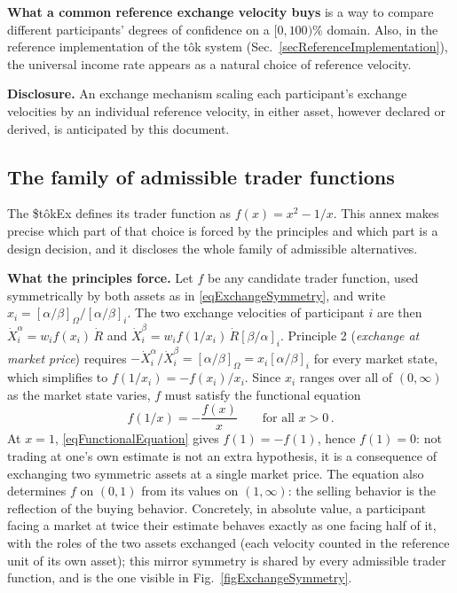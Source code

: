 \documentclass[letterpaper]{article}
\newcommand{\priceAB}{\left[\alpha / \beta\right]}
\newcommand{\priceBA}{\left[\beta / \alpha\right]}
\newcommand{\StokEx}{\$t\^{o}kEx}
\newcommand{\tok}{t\^{o}k}
\begin{document}
\textbf{What a common reference exchange velocity buys} is a way to compare different participants' degrees of confidence on a $[0,100)\%$ domain.
Also, in the reference implementation of the \tok{} system (Sec.~\ref{secReferenceImplementation}), the universal income
rate appears as a natural choice of reference velocity.

\textbf{Disclosure.} An exchange mechanism scaling each participant's exchange velocities
by an individual reference velocity, in either asset, however declared or derived, is
anticipated by this document.


\subsection{The family of admissible trader functions}\label{secTraderFamily}

The \StokEx{} defines its trader function as $f(x) = x^2 - 1/x$. This annex makes precise which part of that choice is forced by the principles and which part is a design decision, and it discloses the whole family of admissible alternatives.

\textbf{What the principles force.} Let $f$ be any candidate trader function, used symmetrically by both assets as in \eqref{eqExchangeSymmetry}, and write $x_i = \priceAB_\Omega / \priceAB_i$. The two exchange velocities of participant $i$ are then $\dot{X}^\alpha_i = w_i f(x_i)\, \dot{R}$ and $\dot{X}^\beta_i = w_i f(1/x_i)\, \dot{R} \priceBA_i$. Principle 2 (\emph{exchange at market price}) requires $-\dot{X}^\alpha_i / \dot{X}^\beta_i = \priceAB_\Omega = x_i \priceAB_i$ for every market state, which simplifies to $f(1/x_i) = -f(x_i)/x_i$. Since $x_i$ ranges over all of $(0,\infty)$ as the market state varies, $f$ must satisfy the functional equation
\begin{equation}
    f(1/x) = -\frac{f(x)}{x} \qquad \text{for all } x > 0\,. \label{eqFunctionalEquation}
\end{equation}
At $x = 1$, \eqref{eqFunctionalEquation} gives $f(1) = -f(1)$, hence $f(1) = 0$: not trading at one's own estimate is not an extra hypothesis, it is a consequence of exchanging two symmetric assets at a single market price. The equation also determines $f$ on $(0,1)$ from its values on $(1,\infty)$: the selling behavior is the reflection of the buying behavior. Concretely, in absolute value, a participant facing a market at twice their estimate behaves exactly as one facing half of it, with the roles of the two assets exchanged (each velocity counted in the reference unit of its own asset); this mirror symmetry is shared by every admissible trader function, and is the one visible in Fig.~\ref{figExchangeSymmetry}.
\end{document}
